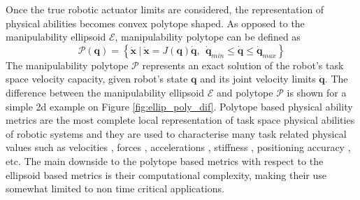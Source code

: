 Once the true robotic actuator limits are considered, the representation of physical abilities becomes convex polytope shaped. As opposed to the manipulability ellipsoid $\mathcal{E}$, manipulability polytope can be defined as
\begin{equation}
    \mathcal{P}(\bm{q}) = \left\{ \dot{\bm{x}} ~|~ \dot{\bm{x}} = J(\bm{q})\dot{\bm{q}},~~ \dot{\bm{q}}_{min}\leq\dot{\bm{q}} \leq \dot{\bm{q}}_{max} \right\}
\end{equation}
The manipulability polytope $\mathcal{P}$ represents an exact solution of the robot's task space velocity capacity, given robot's state $\bm{q}$
and its joint velocity limits $\dot{\bm{q}}$. The difference between the manipulability ellipsoid $\mathcal{E}$ and polytope $\mathcal{P}$ is shown for a simple 2d example on Figure \ref{fig:ellip_poly_dif}.
Polytope based physical ability metrics are the most complete local representation of task space physical abilities of robotic systems and they are used to characterise many task related physical values such as velocities \cite{Lee1997manip, long_constrained_2020}, forces \cite{chiacchio_evaluation_1996}, accelerations \cite{chiacchio_2000}, stiffness \cite{ajoudani2015role}, positioning accuracy \cite{pholsiri2005real}, etc.
The main downside to the polytope based metrics with respect to the ellipsoid based metrics is their computational complexity, making their use somewhat limited to non time critical applications.

